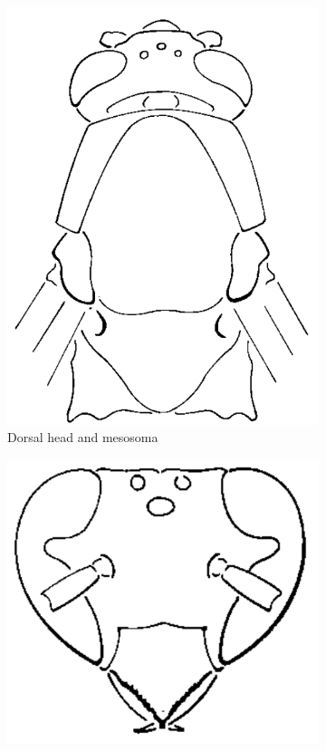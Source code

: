 \documentclass[letterpaper, 11pt]{article}
\begin{document}
\begin{figure}[ht!]
    \centering
    \begin{subfigure}[ht!]{0.25\textwidth}
        \includegraphics[width=\textwidth]{VespidMesosoma}
        \caption{Dorsal head and mesosoma \citep[][pg. 215]{goulet1993hymenoptera}}
        \label{fig:vespid1}
    \end{subfigure}
    \hfill
    \begin{subfigure}[ht!]{0.2\textwidth}
        \includegraphics[width=\textwidth]{VespidHead}

\end{subfigure}
\end{figure}
\end{document}

